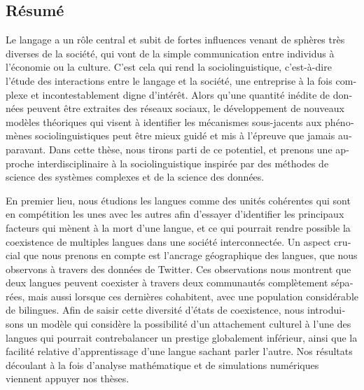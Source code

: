\documentclass[../thesis.tex]{subfiles}
\begin{document}
\begin{otherlanguage}{french}
\chapter*{Résumé}
Le langage a un rôle central et subit de fortes influences venant de sphères très
diverses de la société, qui vont de la simple communication entre individus à l'économie
ou la culture. C'est cela qui rend la sociolinguistique, c'est-à-dire l'étude des
interactions entre le langage et la société, une entreprise à la fois complexe et
incontestablement digne d'intérêt. Alors qu'une quantité inédite de données peuvent être
extraites des réseaux sociaux, le développement de nouveaux modèles théoriques qui
visent à identifier les mécanismes sous-jacents aux phénomènes sociolinguistiques peut
être mieux guidé et mis à l'épreuve que jamais auparavant. Dans cette thèse, nous tirons
parti de ce potentiel, et prenons une approche interdisciplinaire à la sociolinguistique
inspirée par des méthodes de science des systèmes complexes et de la science des
données.

En premier lieu, nous étudions les langues comme des unités cohérentes qui sont en
compétition les unes avec les autres afin d'essayer d'identifier les principaux facteurs
qui mènent à la mort d'une langue, et ce qui pourrait rendre possible la coexistence de
multiples langues dans une société interconnectée. Un aspect crucial que nous prenons en
compte est l'ancrage géographique des langues, que nous observons à travers des données
de Twitter. Ces observations nous montrent que deux langues peuvent coexister à travers
deux communautés complètement séparées, mais aussi lorsque ces dernières cohabitent,
avec une population considérable de bilingues. Afin de saisir cette diversité d'états de
coexistence, nous introduisons un modèle qui considère la possibilité d'un attachement
culturel à l'une des langues qui pourrait contrebalancer un prestige globalement
inférieur, ainsi que la facilité relative d'apprentissage d'une langue sachant parler
l'autre. Nos résultats découlant à la fois d'analyse mathématique et de simulations
numériques viennent appuyer nos thèses.


\end{otherlanguage}
\end{document}
